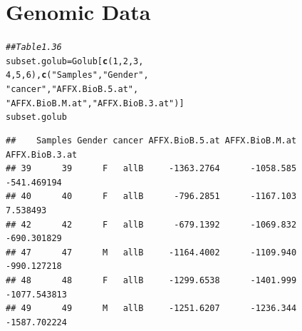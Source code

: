 \documentclass[11pt]{article}\usepackage[]{graphicx}\usepackage[]{color}
\makeatletter
\newcommand{\hlnum}[1]{\textcolor[rgb]{0.686,0.059,0.569}{#1}}%
\newcommand{\hlstr}[1]{\textcolor[rgb]{0.192,0.494,0.8}{#1}}%
\newcommand{\hlcom}[1]{\textcolor[rgb]{0.678,0.584,0.686}{\textit{#1}}}%
\newcommand{\hlstd}[1]{\textcolor[rgb]{0.345,0.345,0.345}{#1}}%
\newcommand{\hlkwb}[1]{\textcolor[rgb]{0.69,0.353,0.396}{#1}}%
\newcommand{\hlkwd}[1]{\textcolor[rgb]{0.737,0.353,0.396}{\textbf{#1}}}%
\newenvironment{kframe}{%
 \def\at@end@of@kframe{}%
 \ifinner\ifhmode%
  \def\at@end@of@kframe{\end{minipage}}%
  \begin{minipage}{\columnwidth}%
 \fi\fi%
 \def\FrameCommand##1{\hskip\@totalleftmargin \hskip-\fboxsep
 \colorbox{shadecolor}{##1}\hskip-\fboxsep
     \hskip-\linewidth \hskip-\@totalleftmargin \hskip\columnwidth}%
 \MakeFramed {\advance\hsize-\width
   \@totalleftmargin\z@ \linewidth\hsize
   \@setminipage}}%
 {\par\unskip\endMakeFramed%
 \at@end@of@kframe}
\newenvironment{knitrout}{}{} %
\makeatother
\begin{document}
\section{Genomic Data}
\begin{knitrout}
\color{fgcolor}\begin{kframe}
\begin{alltt}
\hlcom{## Table 1.36}
\hlstd{subset.golub} \hlkwb{=} \hlstd{Golub[}\hlkwd{c}\hlstd{(}\hlnum{1}\hlstd{,} \hlnum{2}\hlstd{,} \hlnum{3}\hlstd{,}
    \hlnum{4}\hlstd{,} \hlnum{5}\hlstd{,} \hlnum{6}\hlstd{),} \hlkwd{c}\hlstd{(}\hlstr{"Samples"}\hlstd{,} \hlstr{"Gender"}\hlstd{,}
    \hlstr{"cancer"}\hlstd{,} \hlstr{"AFFX.BioB.5.at"}\hlstd{,}
    \hlstr{"AFFX.BioB.M.at"}\hlstd{,} \hlstr{"AFFX.BioB.3.at"}\hlstd{)]}
\hlstd{subset.golub}
\end{alltt}
\begin{verbatim}
##    Samples Gender cancer AFFX.BioB.5.at AFFX.BioB.M.at AFFX.BioB.3.at
## 39      39      F   allB     -1363.2764      -1058.585    -541.469194
## 40      40      F   allB      -796.2851      -1167.103       7.538493
## 42      42      F   allB      -679.1392      -1069.832    -690.301829
## 47      47      M   allB     -1164.4002      -1109.940    -990.127218
## 48      48      F   allB     -1299.6538      -1401.999   -1077.543813
## 49      49      M   allB     -1251.6207      -1236.344   -1587.702224
\end{verbatim}
\end{kframe}
\end{knitrout}
\end{document}
